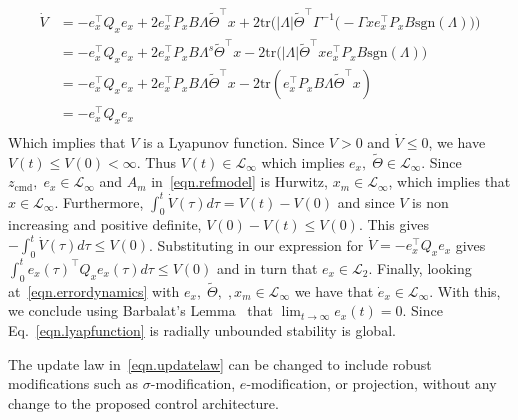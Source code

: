 \documentclass[]{../sty/aiaa-tc}
\theoremstyle{examplestyle}
\begin{document}
\begin{proof-dan}
\begin{equation*}
      \begin{split}
        \dot{V}
        &=
        -e_{x}^{\top}Q_{x}e_{x}
        + 2e_{x}^{\top}P_{x}B\Lambda\widetilde{\Theta}^{\top}x
        +2\text{tr}\bigr(|\Lambda|\widetilde{\Theta}^{\top}\Gamma^{-1}\bigr(-\Gamma xe_{x}^{\top}P_{x}B\text{sgn}(\Lambda)\bigr)\bigr) \\
        &=
        - e_{x}^{\top}Q_{x}e_{x}
        + 2e_{x}^{\top}P_{x}B\Lambda^{s}\widetilde{\Theta}^{\top}x
        - 2\text{tr}\bigr(|\Lambda|\widetilde{\Theta}^{\top}xe_{x}^{\top}P_{x}B\text{sgn}(\Lambda)\bigr) \\
        &=
        - e_{x}^{\top}Q_{x}e_{x}
        + 2e_{x}^{\top}P_{x}B\Lambda\widetilde{\Theta}^{\top}x
        - 2\text{tr}(e_{x}^{\top}P_{x}B\Lambda\widetilde{\Theta}^{\top}x) \\
        &=
        -e_{x}^{\top}Q_{x}e_{x} \\
      \end{split}
    \end{equation*}
    Which implies that $V$ is a Lyapunov function.
    Since $V>0$ and $\dot{V}\leq0$, we have $V(t)\leq V(0)<\infty$.
    Thus $V(t)\in\mathcal{L}_{\infty}$ which implies $e_{x}, \; \widetilde{\Theta}\in\mathcal{L}_{\infty}$.
    Since $z_{\text{cmd}},\;e_{x}\in\mathcal{L}_{\infty}$ and $A_{m}$ in\ \eqref{eqn.refmodel} is Hurwitz, $x_{m}\in\mathcal{L}_{\infty}$, which implies that $x\in\mathcal{L}_{\infty}$.
    Furthermore, $\int_{0}^{t}\dot{V}(\tau)d\tau=V(t)-V(0)$ and since $V$ is non increasing and positive definite, $V(0)-V(t)\leq V(0)$.
    This gives $-\int_{0}^{t}\dot{V}(\tau)d\tau\leq V(0)$.
    Substituting in our expression for $\dot{V}=-e_{x}^{\top}Q_{x}e_{x}$ gives $\int_{0}^{t}e_{x}(\tau)^{\top}Q_{x}e_{x}(\tau)d\tau\leq V(0)$ and in turn that $e_{x}\in\mathcal{L}_{2}$.
    Finally, looking at\ \eqref{eqn.errordynamics} with $e_{x}, \; \widetilde{\Theta}, \;, x_{m}\in\mathcal{L}_{\infty}$ we have that $\dot{e}_{x}\in\mathcal{L}_{\infty}$.
    With this, we conclude using Barbalat's Lemma\ \cite{narendra.stable.2005} that $\lim_{t\rightarrow\infty}e_{x}(t)=0$.
    Since Eq.\ \eqref{eqn.lyapfunction} is radially unbounded stability is global.
  \end{proof-dan}

  \begin{rem-dan}
    The update law in\ \eqref{eqn.updatelaw} can be changed to include robust modifications such as $\sigma$-modification, $e$-modification, or projection, without any change to the proposed control architecture.
  \end{rem-dan}
\end{document}
